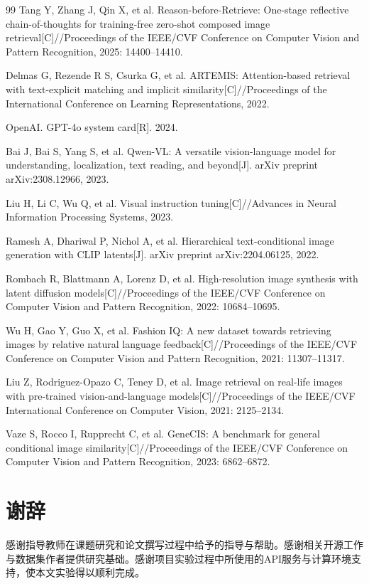\documentclass[12pt,a4paper,UTF8,oneside,openany]{ctexrep}
\begin{document}
\begin{thebibliography}{99}
Tang Y, Zhang J, Qin X, et al. Reason-before-Retrieve: One-stage reflective chain-of-thoughts for training-free zero-shot composed image retrieval[C]//Proceedings of the IEEE/CVF Conference on Computer Vision and Pattern Recognition, 2025: 14400--14410.

Delmas G, Rezende R S, Csurka G, et al. ARTEMIS: Attention-based retrieval with text-explicit matching and implicit similarity[C]//Proceedings of the International Conference on Learning Representations, 2022.

OpenAI. GPT-4o system card[R]. 2024.

Bai J, Bai S, Yang S, et al. Qwen-VL: A versatile vision-language model for understanding, localization, text reading, and beyond[J]. arXiv preprint arXiv:2308.12966, 2023.

Liu H, Li C, Wu Q, et al. Visual instruction tuning[C]//Advances in Neural Information Processing Systems, 2023.

Ramesh A, Dhariwal P, Nichol A, et al. Hierarchical text-conditional image generation with CLIP latents[J]. arXiv preprint arXiv:2204.06125, 2022.

Rombach R, Blattmann A, Lorenz D, et al. High-resolution image synthesis with latent diffusion models[C]//Proceedings of the IEEE/CVF Conference on Computer Vision and Pattern Recognition, 2022: 10684--10695.

Wu H, Gao Y, Guo X, et al. Fashion IQ: A new dataset towards retrieving images by relative natural language feedback[C]//Proceedings of the IEEE/CVF Conference on Computer Vision and Pattern Recognition, 2021: 11307--11317.

Liu Z, Rodriguez-Opazo C, Teney D, et al. Image retrieval on real-life images with pre-trained vision-and-language models[C]//Proceedings of the IEEE/CVF International Conference on Computer Vision, 2021: 2125--2134.

Vaze S, Rocco I, Rupprecht C, et al. GeneCIS: A benchmark for general conditional image similarity[C]//Proceedings of the IEEE/CVF Conference on Computer Vision and Pattern Recognition, 2023: 6862--6872.

\end{thebibliography}


\clearpage
{}
{}
\chapter*{谢辞}

感谢指导教师在课题研究和论文撰写过程中给予的指导与帮助。感谢相关开源工作与数据集作者提供研究基础。感谢项目实验过程中所使用的API服务与计算环境支持，使本文实验得以顺利完成。
\end{document}
